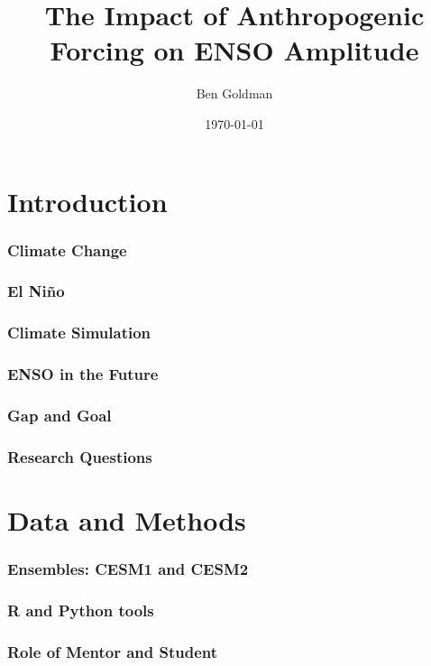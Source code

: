 \documentclass{beamer}
\title{The Impact of Anthropogenic Forcing on ENSO Amplitude}
\author{Ben Goldman}
\date{\today}
\begin{document}
\maketitle

\section{Introduction}

\begin{frame}
  \frametitle{Climate Change}

\end{frame}

\begin{frame}
  \frametitle{El Niño}

\end{frame}

\begin{frame}
  \frametitle{Climate Simulation}

\end{frame}

\begin{frame}
  \frametitle{ENSO in the Future}

\end{frame}

\begin{frame}
  \frametitle{Gap and Goal}

\end{frame}

\begin{frame}
  \frametitle{Research Questions}

\end{frame}

\section{Data and Methods}

\begin{frame}
  \frametitle{Ensembles: CESM1 and CESM2}

\end{frame}

\begin{frame}
  \frametitle{R and Python tools}

\end{frame}

\begin{frame}
  \frametitle{Role of Mentor and Student}

\end{frame}
\end{document}
